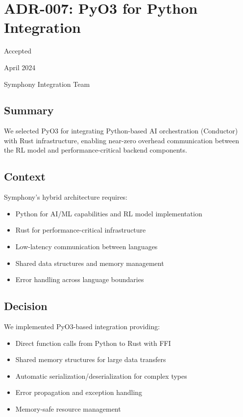 \section*{ADR-007: PyO3 for Python Integration}

\begin{description}[leftmargin=3cm,labelwidth=2.5cm]
\item[\textbf{Status}] Accepted
\item[\textbf{Date}] April 2024
\item[\textbf{Authors}] Symphony Integration Team
\end{description}

\subsection*{Summary}

We selected PyO3 for integrating Python-based AI orchestration (Conductor) with Rust infrastructure, enabling near-zero overhead communication between the RL model and performance-critical backend components.

\subsection*{Context}

Symphony's hybrid architecture requires:
\begin{itemize}
\item Python for AI/ML capabilities and RL model implementation
\item Rust for performance-critical infrastructure
\item Low-latency communication between languages
\item Shared data structures and memory management
\item Error handling across language boundaries
\end{itemize}

\subsection*{Decision}

We implemented PyO3-based integration providing:
\begin{itemize}
\item Direct function calls from Python to Rust with FFI
\item Shared memory structures for large data transfers
\item Automatic serialization/deserialization for complex types
\item Error propagation and exception handling
\item Memory-safe resource management
\end{itemize}

